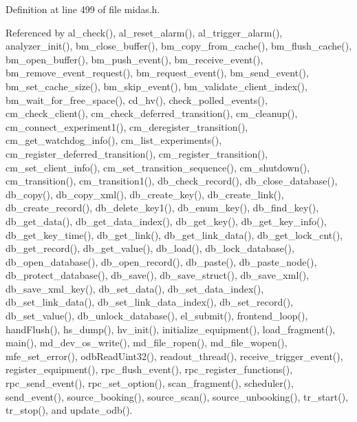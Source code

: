 \begin{DoxyItemize}
\item 
\end{DoxyItemize}

Definition at line 499 of file midas.h.

Referenced by al\_\-check(), al\_\-reset\_\-alarm(), al\_\-trigger\_\-alarm(), analyzer\_\-init(), bm\_\-close\_\-buffer(), bm\_\-copy\_\-from\_\-cache(), bm\_\-flush\_\-cache(), bm\_\-open\_\-buffer(), bm\_\-push\_\-event(), bm\_\-receive\_\-event(), bm\_\-remove\_\-event\_\-request(), bm\_\-request\_\-event(), bm\_\-send\_\-event(), bm\_\-set\_\-cache\_\-size(), bm\_\-skip\_\-event(), bm\_\-validate\_\-client\_\-index(), bm\_\-wait\_\-for\_\-free\_\-space(), cd\_\-hv(), check\_\-polled\_\-events(), cm\_\-check\_\-client(), cm\_\-check\_\-deferred\_\-transition(), cm\_\-cleanup(), cm\_\-connect\_\-experiment1(), cm\_\-deregister\_\-transition(), cm\_\-get\_\-watchdog\_\-info(), cm\_\-list\_\-experiments(), cm\_\-register\_\-deferred\_\-transition(), cm\_\-register\_\-transition(), cm\_\-set\_\-client\_\-info(), cm\_\-set\_\-transition\_\-sequence(), cm\_\-shutdown(), cm\_\-transition(), cm\_\-transition1(), db\_\-check\_\-record(), db\_\-close\_\-database(), db\_\-copy(), db\_\-copy\_\-xml(), db\_\-create\_\-key(), db\_\-create\_\-link(), db\_\-create\_\-record(), db\_\-delete\_\-key1(), db\_\-enum\_\-key(), db\_\-find\_\-key(), db\_\-get\_\-data(), db\_\-get\_\-data\_\-index(), db\_\-get\_\-key(), db\_\-get\_\-key\_\-info(), db\_\-get\_\-key\_\-time(), db\_\-get\_\-link(), db\_\-get\_\-link\_\-data(), db\_\-get\_\-lock\_\-cnt(), db\_\-get\_\-record(), db\_\-get\_\-value(), db\_\-load(), db\_\-lock\_\-database(), db\_\-open\_\-database(), db\_\-open\_\-record(), db\_\-paste(), db\_\-paste\_\-node(), db\_\-protect\_\-database(), db\_\-save(), db\_\-save\_\-struct(), db\_\-save\_\-xml(), db\_\-save\_\-xml\_\-key(), db\_\-set\_\-data(), db\_\-set\_\-data\_\-index(), db\_\-set\_\-link\_\-data(), db\_\-set\_\-link\_\-data\_\-index(), db\_\-set\_\-record(), db\_\-set\_\-value(), db\_\-unlock\_\-database(), el\_\-submit(), frontend\_\-loop(), handFlush(), hs\_\-dump(), hv\_\-init(), initialize\_\-equipment(), load\_\-fragment(), main(), md\_\-dev\_\-os\_\-write(), md\_\-file\_\-ropen(), md\_\-file\_\-wopen(), mfe\_\-set\_\-error(), odbReadUint32(), readout\_\-thread(), receive\_\-trigger\_\-event(), register\_\-equipment(), rpc\_\-flush\_\-event(), rpc\_\-register\_\-functions(), rpc\_\-send\_\-event(), rpc\_\-set\_\-option(), scan\_\-fragment(), scheduler(), send\_\-event(), source\_\-booking(), source\_\-scan(), source\_\-unbooking(), tr\_\-start(), tr\_\-stop(), and update\_\-odb().
